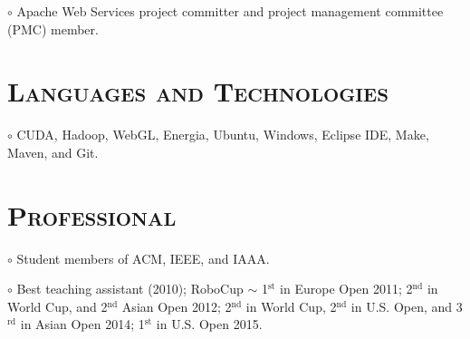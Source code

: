 \begin{resume}
\begin{position}
$\circ$  Apache Web Services project committer  and project management committee (PMC)  member.
\end{position}












\vspace{-2mm}
\section{\textsc{Languages and Technologies}}

\dates{~}
\begin{position}
$\circ$ CUDA, Hadoop, WebGL, Energia, Ubuntu, Windows, Eclipse IDE, Make, Maven, and
Git.
\end{position}

\vspace{-2mm}
\section{\textsc{Professional}}
\dates{~}
\begin{position}
$\circ$ Student members of ACM, IEEE, and IAAA.
\end{position}


\dates{~}
\begin{position}
$\circ$ Best teaching assistant (2010); RoboCup $\sim$ 1$^{\mbox{st}}$ in Europe Open 2011;  
2$^{\mbox{nd}}$ in World Cup, and 2$^{\mbox{nd}}$ Asian Open 2012; 2$^{\mbox{nd}}$ in World Cup, 
2$^{\mbox{nd}}$ in U.S. Open, and  3$^{\mbox{rd}}$ in Asian Open 2014; 1$^{\mbox{st}}$ in U.S. Open 
2015. 
\end{position}



\end{resume}
